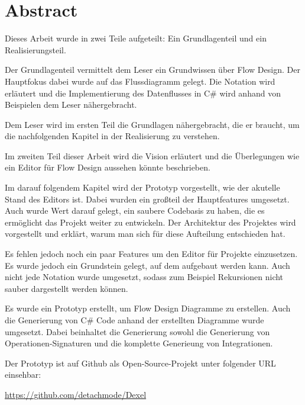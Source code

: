 
\chapter*{Abstract}

Dieses Arbeit wurde in zwei Teile aufgeteilt: 
Ein Grundlagenteil und ein Realisierungsteil.

Der Grundlagenteil vermittelt dem Leser ein Grundwissen über Flow Design.
Der Hauptfokus dabei wurde auf das Flussdiagramm gelegt.
Die Notation wird erläutert und die Implementierung des Datenflusses in C\#
wird anhand von Beispielen dem Leser nähergebracht.

Dem Leser wird im ersten Teil die Grundlagen nähergebracht, die er braucht, um die
nachfolgenden Kapitel in der Realisierung zu verstehen.

Im zweiten Teil dieser Arbeit wird die Vision erläutert und die Überlegungen wie ein
Editor für Flow Design aussehen könnte beschrieben.

Im darauf folgendem Kapitel wird der Prototyp vorgestellt, wie der akutelle Stand des
Editors ist. Dabei wurden ein großteil der Hauptfeatures umgesetzt.
Auch wurde Wert darauf gelegt, ein saubere Codebasis zu haben, die es ermöglicht 
das Projekt weiter zu entwickeln.
Der Architektur des Projektes wird vorgestellt und erklärt, warum man sich für 
diese Aufteilung entschieden hat.

Es fehlen jedoch noch ein paar Features um den Editor für Projekte einzusetzen.
Es wurde jedoch ein Grundstein gelegt, auf dem aufgebaut werden kann.
Auch nicht jede Notation wurde umgesetzt, sodass zum Beispiel Rekursionen
nicht sauber dargestellt werden können.


Es wurde ein Prototyp erstellt, um Flow Design Diagramme zu erstellen.
Auch die Generierung von C\# Code anhand der erstellten Diagramme wurde umgesetzt.
Dabei beinhaltet die Generierung sowohl die Generierung von Operationen-Signaturen und 
die komplette Generieung von Integrationen.



Der Prototyp ist auf Github als Open-Source-Projekt unter folgender URL einsehbar:

\url{https://github.com/detachmode/Dexel}



